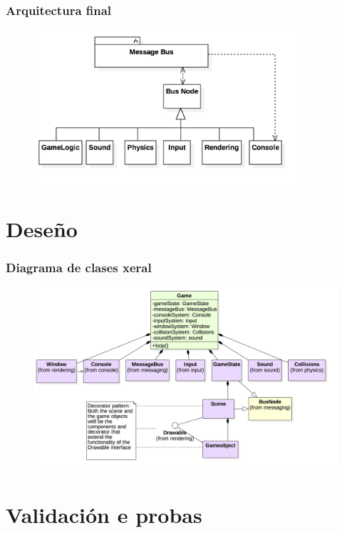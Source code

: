 \documentclass{beamer}
\begin{document}
\begin{frame}
\frametitle{Arquitectura final}
\begin{figure}
	\includegraphics[width=10cm]{../otros/UML/png/final_arq.png}
	\label{dia:arquitectura_final}
\end{figure}
\note{

}
\end{frame}



\section{Deseño}
\begin{frame}
\frametitle{Diagrama de clases xeral}
\begin{figure}
	\vspace*{-1cm}
	\hspace*{-0.5cm}
	\includegraphics[width=12cm]{./diagramaDeClases_gamelogic_simple.png}
	\label{dia:clases}
\end{figure}
\note{
	
}
\end{frame}

\section{Validación e probas}
\end{document}
